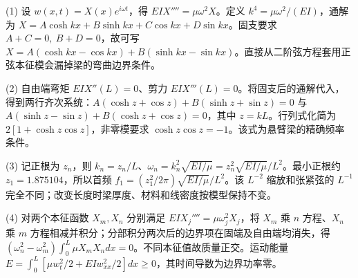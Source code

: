 (1) 设 \(w(x,t)=X(x)e^{i\omega t}\)，得 \(EI X''''=\mu\omega^2 X\)。定义 \(k^4=\mu\omega^2/(EI)\)，通解为 \(X=A\cosh kx+B\sinh kx+C\cos kx+D\sin kx\)。固支要求 \(A+C=0,\ B+D=0\)，故可写 \(X=A(\cosh kx-\cos kx)+B(\sinh kx-\sin kx)\)。直接从二阶弦方程套用正弦本征模会漏掉梁的弯曲边界条件。

(2) 自由端弯矩 \(EI X''(L)=0\)、剪力 \(EI X'''(L)=0\)。将固支后的通解代入，得到两行齐次系统：\(A(\cosh z+\cos z)+B(\sinh z+\sin z)=0\) 与 \(A(\sinh z-\sin z)+B(\cosh z+\cos z)=0\)，其中 \(z=kL\)。行列式化简为 \(2[1+\cosh z\cos z]\)，非零模要求 \(\cosh z\cos z=-1\)。该式为悬臂梁的精确频率条件。

(3) 记正根为 \(z_n\)，则 \(k_n=z_n/L\)、\(\omega_n=k_n^2\sqrt{EI/\mu}=z_n^2\sqrt{EI/\mu}/L^2\)。最小正根约 \(z_1=1.875104\)，所以首频 \(f_1=(z_1^2/2\pi)\sqrt{EI/\mu}/L^2\)。该 \(L^{-2}\) 缩放和张紧弦的 \(L^{-1}\) 完全不同；改变长度时梁厚度、材料和线密度按模型保持不变。

(4) 对两个本征函数 \(X_m,X_n\) 分别满足 \(EI X_j''''=\mu\omega_j^2 X_j\)，将 \(X_m\) 乘 \(n\) 方程、\(X_n\) 乘 \(m\) 方程相减并积分；分部积分两次后的边界项在固端及自由端均消失，得 \((\omega_n^2-\omega_m^2)\int_0^L\mu X_mX_n dx=0\)。不同本征值故质量正交。运动能量 \(E=\int_0^L[\mu w_t^2/2+EI w_{xx}^2/2]dx\ge0\)，其时间导数为边界功率零。
